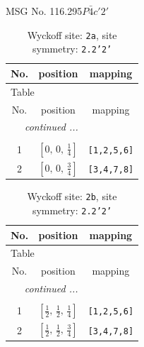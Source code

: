 \documentclass[fleqn,8pt]{jsarticle}
\begin{document}
\setcounter{MaxMatrixCols}{32}

\renewcommand{\tablename}{Table~}
\renewcommand{\figurename}{Figure~}
\begin{center}
\LARGE
MSG No. 116.295\quad$P\bar{4}c'2'$
\end{center}
\renewcommand{\arraystretch}{1.2}
\begin{longtable}{ccc}
\caption{Wyckoff site: {\tt 2a}, site symmetry: {\tt 2.2'2'}}
 \\
 \hline \hline
No. & position & mapping \\ \hline \endfirsthead

\multicolumn{2}{l}{\tablename\ \thetable{}} \\
 \hline \hline
No. & position & mapping \\ \hline \endhead

 \hline \hline
\multicolumn{2}{r}{\footnotesize\it continued ...} \\ \endfoot

 \hline \hline
\multicolumn{2}{r}{} \\ \endlastfoot

1 & $\left[ 0,\, 0,\, \frac{1}{4} \right]$ & {\tt [1,2,5,6]} \\ \hline
2 & $\left[ 0,\, 0,\, \frac{3}{4} \right]$ & {\tt [3,4,7,8]} \\
\end{longtable}
\renewcommand{\arraystretch}{1.2}
\begin{longtable}{ccc}
\caption{Wyckoff site: {\tt 2b}, site symmetry: {\tt 2.2'2'}}
 \\
 \hline \hline
No. & position & mapping \\ \hline \endfirsthead

\multicolumn{2}{l}{\tablename\ \thetable{}} \\
 \hline \hline
No. & position & mapping \\ \hline \endhead

 \hline \hline
\multicolumn{2}{r}{\footnotesize\it continued ...} \\ \endfoot

 \hline \hline
\multicolumn{2}{r}{} \\ \endlastfoot

1 & $\left[ \frac{1}{2},\, \frac{1}{2},\, \frac{1}{4} \right]$ & {\tt [1,2,5,6]} \\ \hline
2 & $\left[ \frac{1}{2},\, \frac{1}{2},\, \frac{3}{4} \right]$ & {\tt [3,4,7,8]} \\
\end{longtable}
\end{document}
